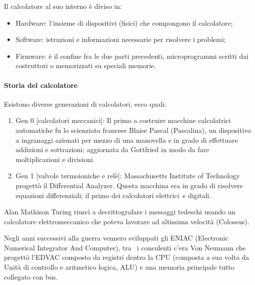 \documentclass[
]{article}
\providecommand{\tightlist}{%
  \setlength{\itemsep}{0pt}\setlength{\parskip}{0pt}}
\begin{document}
{}

{Il calcolatore al suo interno è diviso in:}

{}

\begin{itemize}
\tightlist
\item
  {Hardware}{: l'insieme di dispositivi (fisici) che compongono il
  calcolatore;}
\item
  {Software}{: istruzioni e informazioni necessarie per risolvere i
  problemi;}
\item
  {Firmware}{: è il confine fra le due parti precedenti, microprogrammi
  scritti dai costruttori o memorizzati su speciali memorie.}
\end{itemize}

{}

{}

\paragraph{\texorpdfstring{{Storia del
calcolatore}}{Storia del calcolatore}}\label{h.39yd0g1lvkew}

{Esistono diverse generazioni di calcolatori, ecco quali:}

{}

\begin{enumerate}
\tightlist
\item
  {Gen 0 {[}calcolatori meccanici{]}}{: Il primo a costruire macchine
  calcolatrici automatiche fu lo scienziato francese Blaise Pascal
  (Pascalina), un dispositivo a ingranaggi azionati per mezzo di una
  manovella e in grado di effettuare addizioni e sottrazioni; aggiornata
  da Gottfried in modo da fare moltiplicazioni e divisioni.}
\end{enumerate}

{}

\begin{enumerate}
\setcounter{enumi}{1}
\tightlist
\item
  {Gen 1 {[}valvole termoioniche e relè{]}}{: Massachusetts Institute of
  Technology progettò il Differential Analyzer. Questa macchina era in
  grado di risolvere equazioni differenziali; il primo dei calcolatori
  }{elettrici}{~e digitali.}
\end{enumerate}

{Alan Mathison Turing riuscì a decrittografare i messaggi tedeschi
usando un calcolatore elettromeccanico che poteva lavorare ad altissima
velocità (Colossus).}

{Negli anni successivi alla guerra vennero sviluppati gli ENIAC
(Electronic Numerical Integrator And Computer), tra ~i consulenti c'era
Von Neumann che progettò l'EDVAC composto da registri dentro la CPU
(composta a sua volta da Unità di controllo e aritmetico logica, ALU) e
una memoria principale tutto collegato con bus.}
\end{document}
